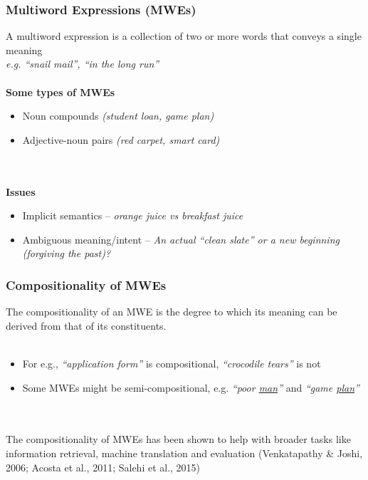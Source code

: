 \documentclass{beamer}
\begin{document}
\begin{frame}
\frametitle{Multiword Expressions (MWEs)}
A multiword expression is a collection of two or more words that conveys a single meaning \\ \textit{e.g. ``snail mail'', ``in the long run''} \\~\\
\textbf{Some types of MWEs}
    \begin{itemize}
        \item Noun compounds \textit{(student loan, game plan)}
        \item Adjective-noun pairs \textit{(red carpet, smart card)}
    \end{itemize}\\~\\
\textbf{Issues}
\begin{itemize}
    \item Implicit semantics -- \textit{orange juice vs breakfast juice}
    \item Ambiguous meaning/intent -- \textit{An actual ``clean slate'' or a new beginning (forgiving the past)?}
\end{itemize}
\end{frame}

\begin{frame}
\frametitle{Compositionality of MWEs}
The compositionality of an MWE is  the degree to which its meaning can be derived from that of its constituents.\\~\\
\begin{itemize}
    \item For e.g., \textit{``application form''} is compositional, \textit{``crocodile tears''} is not
    \item Some MWEs might be semi-compositional, e.g. \textit{``poor \uline{man}''} and \textit{``game \uline{plan}''}
\end{itemize} \\~\\
The compositionality of MWEs has been shown to help with broader tasks like information retrieval, machine translation and evaluation (Venkatapathy \& Joshi, 2006; Acosta et al., 2011; Salehi et al., 2015)
\end{frame}
\end{document}
